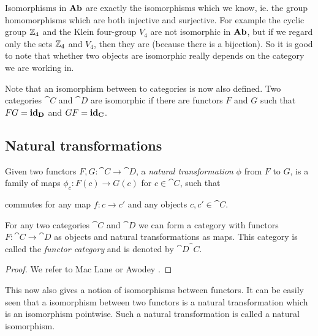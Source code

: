 Isomorphisms in $\mathbf{Ab}$ are exactly the isomorphisms which we know, ie. the group homomorphisms which are both injective and surjective.
For example the cyclic group $\mathbb{Z}_4$ and the Klein four-group $V_4$ are not isomorphic in $\mathbf{Ab}$, but if we regard only the sets $\mathbb{Z}_4$ and $V_4$, then they are (because there is a bijection). So it is good to note that whether two objects are isomorphic  really depends on the category we are working in.

Note that an isomorphism between to categories is now also defined. Two categories $\cat{C}$ and $\cat{D}$ are isomorphic if there are functors $F$ and $G$ such that $ FG = \mathbf{id}_{\mathbf{D}}$ and $GF = \mathbf{id}_{\mathbf{C}}$.

\subsection{Natural transformations}

\begin{definition}
	Given two functors $F, G: \cat{C} \to \cat{D}$, a \emph{natural transformation} $\phi$ from $F$ to $G$, is a family of maps $\phi_c : F(c) \to G(c)$ for $c \in \cat{C}$, such that
	\begin{center}
	\end{center}
	commutes for any map $f: c \to c'$ and any objects $c, c' \in \cat{C}$.
\end{definition}

\begin{lemma}
	For any two categories $\cat{C}$ and $\cat{D}$ we can form a category with functors $F: \cat{C} \to \cat{D}$ as objects and natural transformations as maps. This category is called the \emph{functor category} and is denoted by $\cat{D}^\cat{C}$.
\end{lemma}
\begin{proof}
	We refer to Mac Lane \cite{maclane} or Awodey \cite{awodey}.
\end{proof}

This now also gives a notion of isomorphisms between functors. It can be easily seen that a isomorphism between two functors is a natural transformation which is an isomorphism pointwise. Such a natural transformation is called a natural isomorphism.

